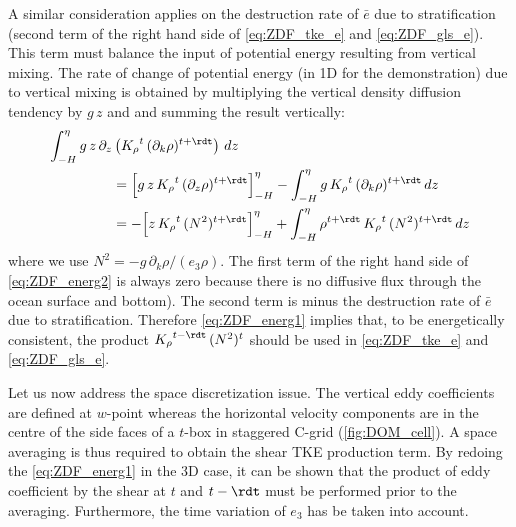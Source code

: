 \documentclass[../main/NEMO_manual]{subfiles}
\begin{document}
A similar consideration applies on the destruction rate of $\bar{e}$ due to stratification
(second term of the right hand side of \autoref{eq:ZDF_tke_e} and \autoref{eq:ZDF_gls_e}).
This term must balance the input of potential energy resulting from vertical mixing.
The rate of change of potential energy (in 1D for the demonstration) due to vertical mixing is obtained by
multiplying the vertical density diffusion tendency by $g\,z$ and and summing the result vertically:
\begin{equation}
  \label{eq:ZDF_energ2}
  \begin{split}
    \int_{-H}^{\eta} g\,z\,\partial_z &\left( {K_\rho}^t \,(\partial_k \rho)^{t+\rdt}   \right) \,dz    \\
    &= \Bigl[  g\,z \,{K_\rho}^t \,(\partial_z \rho)^{t+\rdt} \Bigr]_{-H}^{\eta}
    - \int_{-H}^{\eta}{ g \,{K_\rho}^t \,(\partial_k \rho)^{t+\rdt} } \,dz   \\
    &= - \Bigl[  z\,{K_\rho}^t \,(N^2)^{t+\rdt} \Bigr]_{-H}^{\eta}
    + \int_{-H}^{\eta}{  \rho^{t+\rdt} \, {K_\rho}^t \,(N^2)^{t+\rdt} \,dz  }
  \end{split}
\end{equation}
where we use $N^2 = -g \,\partial_k \rho / (e_3 \rho)$.
The first term of the right hand side of \autoref{eq:ZDF_energ2} is always zero because
there is no diffusive flux through the ocean surface and bottom).
The second term is minus the destruction rate of  $\bar{e}$ due to stratification.
Therefore \autoref{eq:ZDF_energ1} implies that, to be energetically consistent,
the product ${K_\rho}^{t-\rdt}\,(N^2)^t$ should be used in \autoref{eq:ZDF_tke_e} and  \autoref{eq:ZDF_gls_e}.

Let us now address the space discretization issue.
The vertical eddy coefficients are defined at $w$-point whereas the horizontal velocity components are in
the centre of the side faces of a $t$-box in staggered C-grid (\autoref{fig:DOM_cell}).
A space averaging is thus required to obtain the shear TKE production term.
By redoing the \autoref{eq:ZDF_energ1} in the 3D case, it can be shown that the product of eddy coefficient by
the shear at $t$ and $t-\rdt$ must be performed prior to the averaging.
Furthermore, the time variation of $e_3$ has be taken into account.
\end{document}

